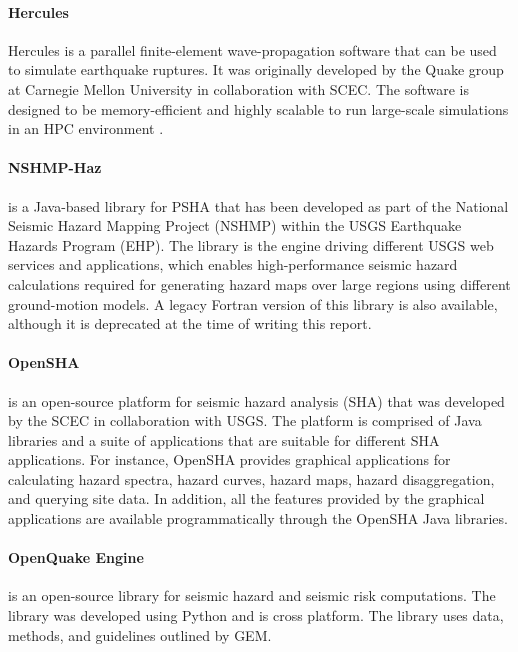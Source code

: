 \paragraph{Hercules} Hercules \citep{tu2006mesh} is a parallel finite-element wave-propagation software that can be used to simulate earthquake ruptures. It was originally developed by the Quake group at Carnegie Mellon University in collaboration with SCEC. The software is designed to be memory-efficient and highly scalable to run large-scale simulations in an HPC environment \citep{taborda2010speeding}. 

\paragraph{NSHMP-Haz}  is a Java-based library for PSHA that has been developed as part of the National Seismic Hazard Mapping Project (NSHMP) within the USGS Earthquake Hazards Program (EHP). The library is the engine driving different USGS web services and applications, which enables high-performance seismic hazard calculations required for generating hazard maps over large regions using different ground-motion models. A legacy Fortran version of this library is also available, although it is deprecated at the time of writing this report.

\paragraph{OpenSHA}  \citep{field2003opensha} is an open-source platform for seismic hazard analysis (SHA) that was developed by the SCEC in collaboration with USGS. The platform is comprised of Java libraries and a suite of applications that are suitable for different SHA applications. For instance, OpenSHA provides graphical applications for calculating hazard spectra, hazard curves, hazard maps, hazard disaggregation, and querying site data. In addition, all the features provided by the graphical applications are available programmatically through the OpenSHA Java libraries.

\paragraph{OpenQuake Engine}  \citep{pagani2014openquake} is an open-source library for seismic hazard and seismic risk computations. The library was developed using Python and is cross platform. The library uses data, methods, and guidelines outlined by GEM.

